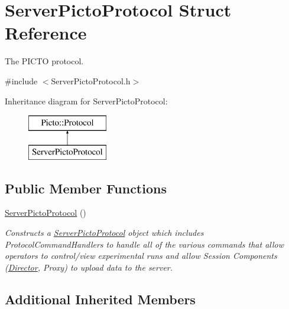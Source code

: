 \hypertarget{struct_server_picto_protocol}{\section{Server\-Picto\-Protocol Struct Reference}
\label{struct_server_picto_protocol}
}


The P\-I\-C\-T\-O protocol.  




{\ttfamily \#include $<$Server\-Picto\-Protocol.\-h$>$}

Inheritance diagram for Server\-Picto\-Protocol\-:\begin{figure}[H]
\begin{center}
\leavevmode
\includegraphics[height=2.000000cm]{struct_server_picto_protocol}
\end{center}
\end{figure}
\subsection*{Public Member Functions}
\begin{DoxyCompactItemize}
\item 
\hypertarget{struct_server_picto_protocol_a0a2b3687957e1b3557736e2473a4c7ce}{\hyperlink{struct_server_picto_protocol_a0a2b3687957e1b3557736e2473a4c7ce}{Server\-Picto\-Protocol} ()}\label{struct_server_picto_protocol_a0a2b3687957e1b3557736e2473a4c7ce}

\begin{DoxyCompactList}\small\item\em Constructs a \hyperlink{struct_server_picto_protocol}{Server\-Picto\-Protocol} object which includes Protocol\-Command\-Handlers to handle all of the various commands that allow operators to control/view experimental runs and allow Session Components (\hyperlink{class_director}{Director}, Proxy) to upload data to the server. \end{DoxyCompactList}\end{DoxyCompactItemize}
\subsection*{Additional Inherited Members}



